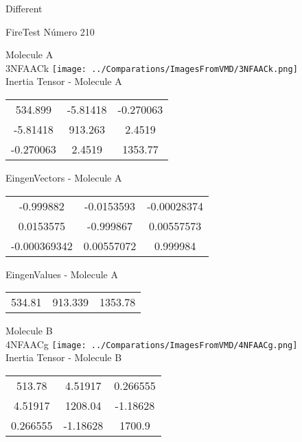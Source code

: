 \begin{center}
\vtab
\vtab
\textcolor{NavyBlue}{\Large Different}
\end{center}

 \newpage

\vtab[-2cm]
\begin{center}
{\large FireTest \tab Número 210}
\end{center}
\begin{multicols}{2}
\begin{center}

Molecule A \\ 
3NFAACk
\texttt{[image: ../Comparations/ImagesFromVMD/3NFAACk.png]}
\\
Inertia Tensor - Molecule A \\
\vtab

\begin{tabular}{|c c c|}
534.899	 & 	-5.81418	 & 	-0.270063	 \\
-5.81418	 & 	913.263	 & 	2.4519	 \\
-0.270063	 & 	2.4519	 & 	1353.77
\end{tabular}

\vtab
 EingenVectors - Molecule A     \\
\vtab
\begin{tabular}{|c c c|}
-0.999882	 & 	-0.0153593	 & 	-0.00028374	 \\
0.0153575	 & 	-0.999867	 & 	0.00557573	 \\
-0.000369342	 & 	0.00557072	 & 	0.999984
\end{tabular}

\vtab
 EingenValues - Molecule A     \\
\vtab
\begin{tabular}{|c c c|}
534.81	 & 	913.339	 & 	1353.78	 \\
\end{tabular}
\columnbreak

Molecule B \\ 
4NFAACg
\texttt{[image: ../Comparations/ImagesFromVMD/4NFAACg.png]}
\\
Inertia Tensor - Molecule B \\
\vtab

\begin{tabular}{|c c c|}
513.78	 & 	4.51917	 & 	0.266555	 \\
4.51917	 & 	1208.04	 & 	-1.18628	 \\
0.266555	 & 	-1.18628	 & 	1700.9
\end{tabular}


\end{center}
\end{multicols}
